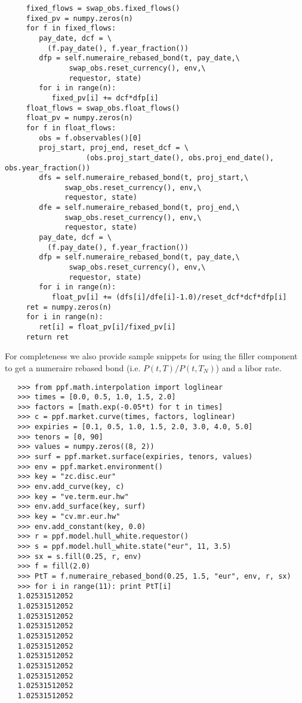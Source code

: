 \begin{verbatim}
     fixed_flows = swap_obs.fixed_flows()
     fixed_pv = numpy.zeros(n)
     for f in fixed_flows:
        pay_date, dcf = \
          (f.pay_date(), f.year_fraction())
        dfp = self.numeraire_rebased_bond(t, pay_date,\
               swap_obs.reset_currency(), env,\
               requestor, state)
        for i in range(n):
           fixed_pv[i] += dcf*dfp[i]
     float_flows = swap_obs.float_flows()
     float_pv = numpy.zeros(n)
     for f in float_flows:
        obs = f.observables()[0]
        proj_start, proj_end, reset_dcf = \
                   (obs.proj_start_date(), obs.proj_end_date(), obs.year_fraction())
        dfs = self.numeraire_rebased_bond(t, proj_start,\
              swap_obs.reset_currency(), env,\
              requestor, state)
        dfe = self.numeraire_rebased_bond(t, proj_end,\
              swap_obs.reset_currency(), env,\
              requestor, state)
        pay_date, dcf = \
          (f.pay_date(), f.year_fraction())
        dfp = self.numeraire_rebased_bond(t, pay_date,\
               swap_obs.reset_currency(), env,\
               requestor, state)
        for i in range(n):
           float_pv[i] += (dfs[i]/dfe[i]-1.0)/reset_dcf*dcf*dfp[i]
     ret = numpy.zeros(n)
     for i in range(n):
        ret[i] = float_pv[i]/fixed_pv[i]
     return ret
\end{verbatim}

For completeness we also provide sample snippets for using the filler
component to get a numeraire rebased bond (i.e. $P(t,T)/P(t,T_N)$) and
a libor rate.

\begin{verbatim} 
   >>> from ppf.math.interpolation import loglinear
   >>> times = [0.0, 0.5, 1.0, 1.5, 2.0]
   >>> factors = [math.exp(-0.05*t) for t in times]
   >>> c = ppf.market.curve(times, factors, loglinear)
   >>> expiries = [0.1, 0.5, 1.0, 1.5, 2.0, 3.0, 4.0, 5.0]
   >>> tenors = [0, 90]
   >>> values = numpy.zeros((8, 2))
   >>> surf = ppf.market.surface(expiries, tenors, values)
   >>> env = ppf.market.environment()
   >>> key = "zc.disc.eur"
   >>> env.add_curve(key, c)
   >>> key = "ve.term.eur.hw"
   >>> env.add_surface(key, surf)
   >>> key = "cv.mr.eur.hw"
   >>> env.add_constant(key, 0.0)
   >>> r = ppf.model.hull_white.requestor()
   >>> s = ppf.model.hull_white.state("eur", 11, 3.5)
   >>> sx = s.fill(0.25, r, env)
   >>> f = fill(2.0)
   >>> PtT = f.numeraire_rebased_bond(0.25, 1.5, "eur", env, r, sx)
   >>> for i in range(11): print PtT[i]
   1.02531512052
   1.02531512052
   1.02531512052
   1.02531512052
   1.02531512052
   1.02531512052
   1.02531512052
   1.02531512052
   1.02531512052
   1.02531512052
   1.02531512052
\end{verbatim}

